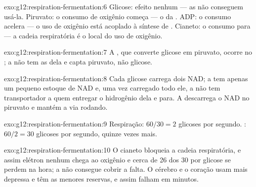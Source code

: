 \begin{solution}{exo:g12:respiration-fermentation:6}
Glicose: efeito nenhum --- as  não conseguem usá-la.
Piruvato: o consumo de oxigênio começa --- o  da .
ADP: o consumo acelera --- o uso de oxigênio está acoplado à síntese de
. Cianeto: o consumo para --- a cadeia respiratória é o local do uso
de oxigênio.
\end{solution}

\begin{solution}{exo:g12:respiration-fermentation:7}
A , que converte glicose em piruvato, ocorre no ; a
 não tem as  dela e capta piruvato, não glicose.
\end{solution}

\begin{solution}{exo:g12:respiration-fermentation:8}
Cada glicose carrega dois NAD; a  tem apenas um pequeno estoque
de NAD e, uma vez carregado todo ele, a  não tem transportador
a quem entregar o hidrogênio dela e para. A  descarrega o
NAD no piruvato e mantém a via rodando.
\end{solution}

\begin{solution}{exo:g12:respiration-fermentation:9}
Respiração: $60/30 = 2$ glicoses por segundo. : $60/2 = 30$
glicoses por segundo, quinze vezes mais.
\end{solution}

\begin{solution}{exo:g12:respiration-fermentation:10}
O cianeto bloqueia a cadeia respiratória, e assim elétron nenhum chega
ao oxigênio e cerca de 26 dos 30  por glicose se perdem na hora; a
 não consegue cobrir a falta. O cérebro e o coração usam 
mais depressa e têm as menores reservas, e assim falham em minutos.
\end{solution}

